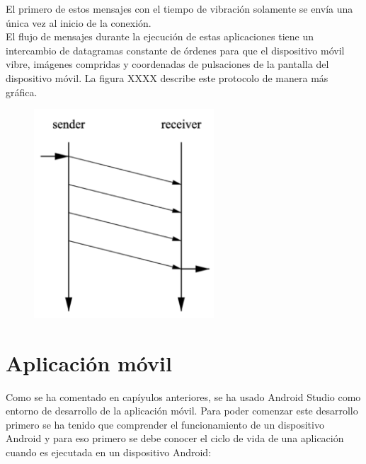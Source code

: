 El primero de estos mensajes con el tiempo de vibraci\'on solamente se env\'ia una \'unica vez al inicio de la conexi\'on.
\\
El flujo de mensajes durante la ejecuci\'on de estas aplicaciones tiene un intercambio de datagramas constante de \'ordenes para que el dispositivo m\'ovil vibre, im\'agenes compridas y coordenadas de pulsaciones de la pantalla del dispositivo m\'ovil.
La figura XXXX describe este protocolo de manera m\'as gr\'afica.

\begin{figure}[h]

\centering
\includegraphics[width=0.6\textwidth]{Imagenes/Bitmap/UDP-protocol.png}
\end{figure}

\newpage
\section{Aplicaci\'on m\'ovil}
\label{cap4:sec:android}
Como se ha comentado en cap\'iyulos anteriores, se ha usado Android Studio como entorno de desarrollo de la aplicaci\'on m\'ovil. Para poder comenzar este desarrollo primero se ha tenido que comprender el funcionamiento de un dispositivo Android y para eso primero se debe conocer el ciclo de vida de una aplicaci\'on cuando es ejecutada en un dispositivo Android:

